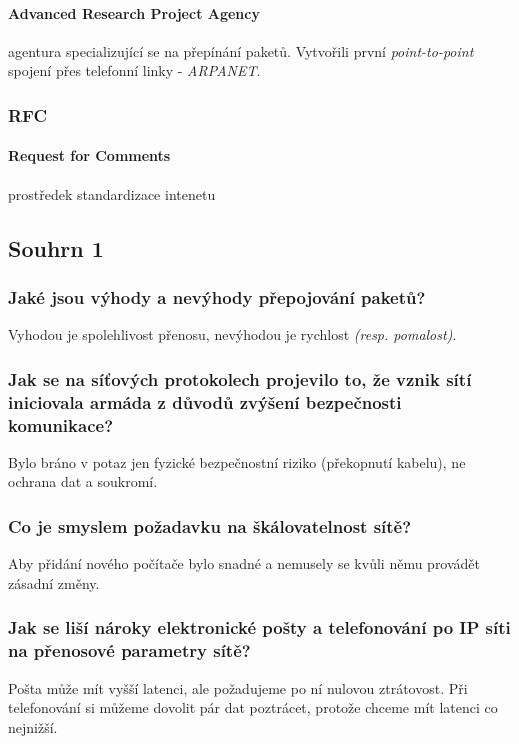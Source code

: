 \documentclass[10pt,a4paper]{article}
\begin{document}
\paragraph{Advanced Research Project Agency} agentura specializující se na přepínání paketů. Vytvořili první \textit{point-to-point} spojení přes telefonní linky - \textit{ARPANET}.

\subsubsection{RFC}

\paragraph{Request for Comments} prostředek standardizace intenetu

\subsection{Souhrn 1}

\subsubsection{Jaké jsou výhody a nevýhody přepojování paketů?}
Vyhodou je spolehlivost přenosu, nevýhodou je rychlost \textit{(resp. pomalost)}.

\subsubsection{Jak se na síťových protokolech projevilo to, že vznik sítí iniciovala armáda z důvodů zvýšení bezpečnosti komunikace?}
Bylo bráno v potaz jen fyzické bezpečnostní riziko (překopnutí kabelu), ne ochrana dat a soukromí.


\subsubsection{Co je smyslem požadavku na škálovatelnost sítě?}
Aby přidání nového počítače bylo snadné a nemusely se kvůli němu provádět zásadní změny.

\subsubsection{Jak se liší nároky elektronické pošty a telefonování po IP síti na přenosové parametry sítě?}
Pošta může mít vyšší latenci, ale požadujeme po ní nulovou ztrátovost. Při telefonování si můžeme dovolit pár dat poztrácet, protože chceme mít latenci co nejnižší.
\end{document}
